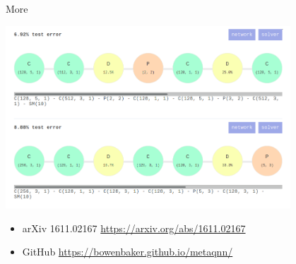 \documentclass{beamer}
\begin{document}
\begin{frame}{More}
\begin{center}
\includegraphics[width=0.8\textwidth]{bowen.png}
\end{center}
\begin{itemize}
\item arXiv 1611.02167 \url{https://arxiv.org/abs/1611.02167}
\item GitHub \url{https://bowenbaker.github.io/metaqnn/}
\end{itemize}
\end{frame}
\end{document}
